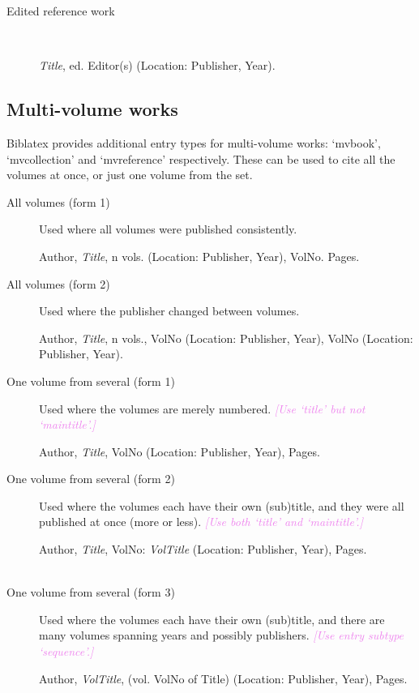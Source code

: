 \documentclass[extrafontsizes,11pt,a4paper,oneside]{memoir}
\newcommand*{\lit}[1]{\textsf{#1}}
\newcommand*{\code}[1]{`\textsf{#1}'}
\newcommand*{\aside}[1]{\textcolor{violet}{\emph{[#1]}}}
\begin{document}
\begin{description}
  \item[Edited reference work]~\par
  \emph{Title}, \lit{ed.} Editor(s) (Location: Publisher, Year).
  \\
\end{description}

\subsection{Multi-volume works}

Biblatex provides additional entry types for multi-volume works: \code{mvbook}, \code{mvcollection} and \code{mvreference} respectively. These can be used to cite all the volumes at once, or just one volume from the set.

\begin{description}
  \item[All volumes (form 1)] Used where all volumes were published consistently.
  \par Author, \emph{Title}, n \lit{vols.} (Location: Publisher, Year), VolNo. Pages.
  \\
  
  \item[All volumes (form 2)] Used where the publisher changed between volumes.
  \par Author, \emph{Title}, n \lit{vols.}, VolNo (Location: Publisher, Year), VolNo (Location: Publisher, Year).
  \\
  
  \item[One volume from several (form 1)] Used where the volumes are merely numbered. \aside{Use \code{title} but not \code{maintitle}.}
  \par Author, \emph{Title}, VolNo (Location: Publisher, Year), Pages.
  \\
  
  \item[One volume from several (form 2)] Used where the volumes each have their own (sub)title, and they were all published at once (more or less). \aside{Use both \code{title} and \code{maintitle}.}
  \par Author, \emph{Title}, VolNo: \emph{VolTitle} (Location: Publisher, Year), Pages.
  \\
  \\
  
  \item[One volume from several (form 3)] Used where the volumes each have their own (sub)title, and there are many volumes spanning years and possibly publishers. \aside{Use entry subtype \code{sequence}.}
  \par Author, \emph{VolTitle}, (\lit{vol.} VolNo \lit{of} Title) (Location: Publisher, Year), Pages.
  \\
\end{description}
\end{document}
